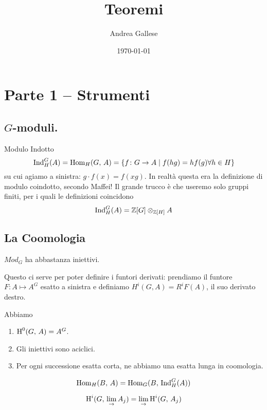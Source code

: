\documentclass[a4paper]{article}
\title{Teoremi}\let\Title\@title
\author{Andrea Gallese}\let\Author\@author
\date{\today}\let\Date\@date
\begin{document}
	
	\section{Parte 1 -- Strumenti}
	
	\subsection{$ G $-moduli.}
	\begin{definition}{Modulo Indotto}
		\[ \operatorname{Ind}_H^G(A) = \operatorname{Hom}_H(G, \, A) = \{ f \colon G \to A \mid f(hg) = h f(g) \forall h \in H \} \]
		su cui agiamo a sinistra: $ g \cdot f(x) = f(xg) $. In realtà questa era la definizione di modulo coindotto, secondo Maffei! Il grande trucco è che useremo solo gruppi finiti, per i quali le definizioni coincidono
		\[ \operatorname{Ind}_H^G(A) = \mathbb{Z}[G] \otimes_{\mathbb{Z}[H]} A \]
	\end{definition}

	\subsection{La Coomologia}
	\begin{theorem}
		$ Mod_G $ ha abbastanza iniettivi.
	\end{theorem}

	Questo ci serve per poter definire i funtori derivati: prendiamo il funtore $ F \colon A \mapsto A^G $ esatto a sinistra e definiamo $ H^i(G, A) = R^iF(A) $, il suo derivato destro.
	
	\begin{theorem}
		Abbiamo
		\begin{enumerate}
			\item $ \operatorname{H}^0(G,\, A) = A^G $.
			\item Gli iniettivi sono aciclici.
			\item Per ogni successione esatta corta, ne abbiamo una esatta lunga in coomologia.
		\end{enumerate}
	\end{theorem}

	\begin{theorem}
		\[ \operatorname{Hom}_H(B,\, A) = \operatorname{Hom}_G(B, \, \operatorname{Ind}_H^G(A)) \]
	\end{theorem}

	\begin{theorem}
		\[ \operatorname{H}^i(G, \, \lim_{\rightarrow} A_j) =  \lim_{\rightarrow}\operatorname{H}^i(G, \, A_j) \]
	\end{theorem}
\end{document}
